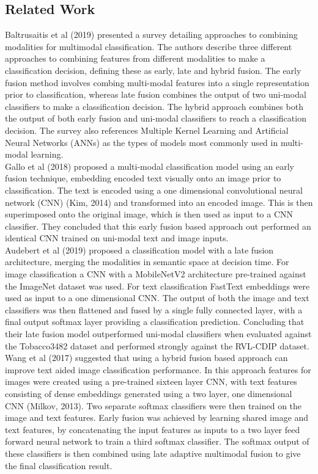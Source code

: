 \documentclass[a4paper,12pt]{article}
\begin{document}
\subsection{Related Work}
Baltrusaitis et al (2019) presented a survey detailing approaches to combining modalities for multimodal classification. The authors describe three different approaches to combining features from different modalities to make a classification decision, defining these as early, late and hybrid fusion. The early fusion method involves combing multi-modal features into a single representation prior to classification, whereas late fusion combines the output of two uni-modal classifiers to make a classification decision. The hybrid approach combines both the output of both early fusion and uni-modal classifiers to reach a classification decision. The survey also references Multiple Kernel Learning and Artificial Neural Networks (ANNs) as the types of models most commonly used in multi-modal learning.\\

Gallo et al (2018) proposed a multi-modal classification model using an early fusion technique, embedding encoded text visually onto an image prior to classification. The text is encoded using a one dimensional convolutional neural network (CNN) (Kim, 2014) and transformed into an encoded image. This is then superimposed onto the original image, which is then used as input to a CNN classifier. They concluded that this early fusion based approach out performed an identical CNN trained on uni-modal text and image inputs.\\

Audebert et al (2019) proposed a classification model with a late fusion architecture, merging the modalities in semantic space at decision time. For image classification a CNN with a MobileNetV2 architecture pre-trained against the ImageNet dataset was used. For text classification FastText  embeddings were used as input to a one dimensional CNN. The output of both the image and text classifiers was then flattened and fused by a single fully connected layer, with a final output softmax layer providing a classification prediction. Concluding that their late fusion model outperformed uni-modal classifiers when evaluated against the Tobacco3482 dataset and performed strongly against the RVL-CDIP dataset.  \\

Wang et al (2017) suggested that using a hybrid fusion based approach can improve text aided image classification performance. In this approach features for images were created using a pre-trained sixteen layer CNN, with text features consisting of dense embeddings generated using a two layer, one dimensional CNN (Milkov, 2013). Two separate softmax classifiers were then trained on the image and text features. Early fusion was achieved by learning shared image and text features, by concatenating the input features as inputs to a two layer feed forward neural network to train a third softmax classifier. The softmax output of these classifiers is then combined using late adaptive multimodal fusion to give the final classification result.\\
\end{document}
